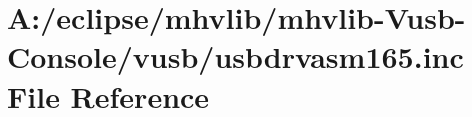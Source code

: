 \hypertarget{mhvlib-_vusb-_console_2vusb_2usbdrvasm165_8inc}{\section{A\-:/eclipse/mhvlib/mhvlib-\/\-Vusb-\/\-Console/vusb/usbdrvasm165.inc File Reference}
\label{mhvlib-_vusb-_console_2vusb_2usbdrvasm165_8inc}
}
